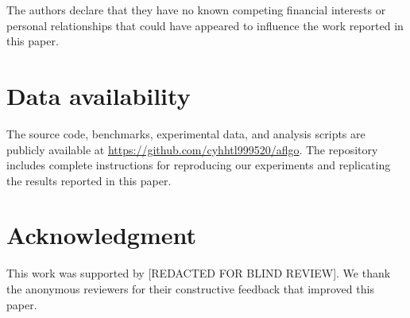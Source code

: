 \documentclass[review]{elsarticle}
\begin{document}
The authors declare that they have no known competing financial interests or personal relationships that could have appeared to influence the work reported in this paper.

\section*{Data availability}

The source code, benchmarks, experimental data, and analysis scripts are publicly available at \url{https://github.com/cyhhtl999520/aflgo}. The repository includes complete instructions for reproducing our experiments and replicating the results reported in this paper.

\section*{Acknowledgment}

This work was supported by [REDACTED FOR BLIND REVIEW]. We thank the anonymous reviewers for their constructive feedback that improved this paper.
\end{document}
